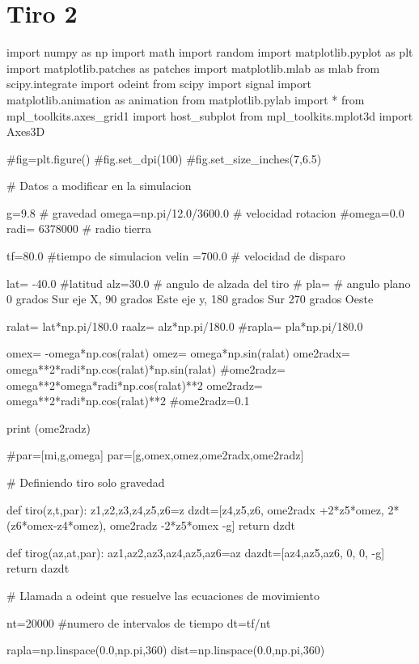 \documentclass{article}
\begin{document}
\section{Tiro 2}
\begin{python}
import numpy as np
import math
import random
import matplotlib.pyplot as plt
import matplotlib.patches as patches
import matplotlib.mlab as mlab
from scipy.integrate import odeint
from scipy import signal
import matplotlib.animation as animation
from matplotlib.pylab import *
from mpl_toolkits.axes_grid1 import host_subplot
from mpl_toolkits.mplot3d import Axes3D


#fig=plt.figure()
#fig.set_dpi(100)
#fig.set_size_inches(7,6.5)


# Datos a modificar en la simulacion 


g=9.8      # gravedad
omega=np.pi/12.0/3600.0     # velocidad rotacion
#omega=0.0
radi= 6378000  # radio tierra

tf=80.0    #tiempo de simulacion
velin =700.0 # velocidad de disparo



lat= -40.0  #latitud
alz=30.0 # angulo de alzada del tiro
#  pla=   # angulo plano 0 grados Sur eje X, 90 grados Este eje y, 180 grados Sur 270 grados Oeste

ralat= lat*np.pi/180.0
raalz= alz*np.pi/180.0
#rapla= pla*np.pi/180.0

omex= -omega*np.cos(ralat)
omez= omega*np.sin(ralat)
ome2radx= omega**2*radi*np.cos(ralat)*np.sin(ralat)
#ome2radz= omega**2*omega*radi*np.cos(ralat)**2
ome2radz= omega**2*radi*np.cos(ralat)**2
#ome2radz=0.1

print (ome2radz) 


#par=[mi,g,omega]
par=[g,omex,omez,ome2radx,ome2radz]

# Definiendo tiro solo gravedad

def tiro(z,t,par):
    z1,z2,z3,z4,z5,z6=z  
    dzdt=[z4,z5,z6, 
          ome2radx +2*z5*omez,
          2*(z6*omex-z4*omez),
          ome2radz -2*z5*omex -g]
    return dzdt


def tirog(az,at,par):
    az1,az2,az3,az4,az5,az6=az  
    dazdt=[az4,az5,az6, 0, 0, -g]
    return dazdt


# Llamada a odeint que resuelve las ecuaciones de movimiento



nt=20000  #numero de intervalos de tiempo
dt=tf/nt

rapla=np.linspace(0.0,np.pi,360)
dist=np.linspace(0.0,np.pi,360)


\end{python}
\end{document}
